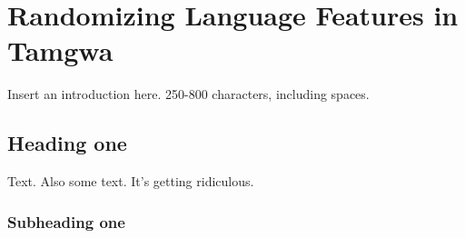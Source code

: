 \documentclass[a4paper,12pt,twoside,openright]{memoir}
\begin{document}



\chapter[Randomizing Language Features][Tamgwa]{Randomizing Language Features in Tamgwa}


\thispagestyle{fancy}
\BgUsetrue


Insert an introduction here. 250-800 characters, including spaces.

\section*{Heading one} %


Text. Also some text. It's getting ridiculous.




\lipsum[2]



\subsection*{Subheading one}

\lipsum[4]

\lipsum[5]
\end{document}
